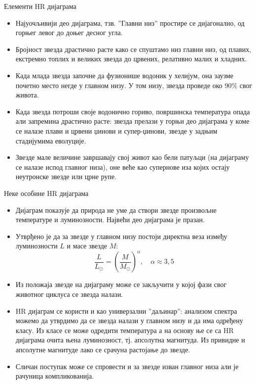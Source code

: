 \documentclass[aspectratio=169, xcolor=table, 10pt]{beamer}
\begin{document}
\begin{frame}{Елементи HR дијаграма}
  \begin{itemize}
    \item Најуочљивији део дијаграма, тзв. ”Главни низ” простире се дијагонално, од горњег левог до доњег десног угла.
    \item Бројност звезда драстично расте како се спуштамо низ главни низ, од плавих, екстремно топлих и великих звезда до црвених, релативно малих и хладних.
    \item Када млада звезда започне да фузионише водоник у хелијум, она заузме почетно место негде у главном низу. У том низу, звезда проведе око 90\% свог живота.
    \item Када звезда потроши своје водонично гориво, површинска температура опада али запремина драстично расте: звезда прелази у горњи део дијаграма у коме се налазе плави и црвени џинови и супер-џинови, звезде у задњим стадијумима еволуције.
    \item Звезде мале величине завршавају свој живот као бели патуљци (на дијаграму се налазе испод главног низа), оне веће као супернове иза којих остају неутронске звезде или црне рупе.
  \end{itemize}
\end{frame}

\begin{frame}{Неке особине HR дијаграма}
  \begin{itemize}
    \item Дијаграм показује да природа не уме да створи звезде произвољне температуре и луминозности. Највећи део дијаграма је празан.
    \item Утврђено је да за звезде у главном низу постоји директна веза између луминозности $L$ и масе звезде $M$:
      \begin{equation*}
        \frac{L}{L_\odot}=\left(\frac{M}{M_\odot}\right)^\alpha,\quad \alpha\approx 3,5
      \end{equation*}
    \item Из положаја звезде на дијаграму може се закључити у којој фази свог животног циклуса се звезда налази.
    \item HR дијаграм се користи и као универзални ”даљинар”: анализом спектра можемо да утврдимо да се звезда налази у главном низу и да има одређену класу. Из класе се може одредити температура а на основу ње се са HR дијаграма очита њена луминозност, тј. апсолутна магнитуда. Из привидне и апсолутне магнитуде лако се срачуна растојање до звезде.
    \item Сличан поступак може се спровести и за звезде изван главног низа али је рачуница компликованија.
  \end{itemize}
\end{frame}
\end{document}
